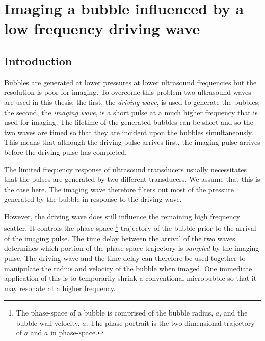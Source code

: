 \chapter{Imaging a bubble influenced by a low frequency driving wave}\label{ch:mechanisms}




\section{Introduction}

Bubbles are generated at lower pressures at lower ultrasound frequencies\cite{Willard}
but the resolution is poor for imaging.
To overcome this problem two ultrasound waves are used in this thesis;
the first, the {\em driving wave}, is used to generate the bubbles; 
the second, the  {\em imaging wave}, is a short pulse at a much higher frequency that is used for imaging.
The  lifetime of the generated bubbles can be short
and so the two waves are timed so that they are incident upon the bubbles simultaneously.
This means that although the driving pulse arrives first,
the imaging pulse arrives before the driving pulse has completed.

The limited frequency response of ultrasound transducers usually necessitates that the pulses
are generated by two different transducers.
We assume that this is the case here.
The imaging wave therefore filters out most of the pressure generated by the bubble in response to the driving wave.

However, the driving wave does still influence the remaining high frequency scatter.
It controls the phase-space%
\footnote{
  The phase-space of a bubble is comprised of the bubble radius, $a$, and the bubble wall velocity, $\dot a$.
  The phase-portrait is the two dimensional trajectory of  $a$ and $\dot a$ in phase-space.
}
trajectory of the bubble prior to the arrival of the imaging pulse.
The time  delay between the arrival of the two waves determines 
which portion of the phase-space trajectory is {\em sampled} by the imaging pulse.
The driving wave and the time delay can therefore be used together to manipulate the  radius and velocity
of the bubble when imaged. 
One immediate application of this is to temporarily shrink a conventional microbubble  so that it
may resonate at a higher frequency.

